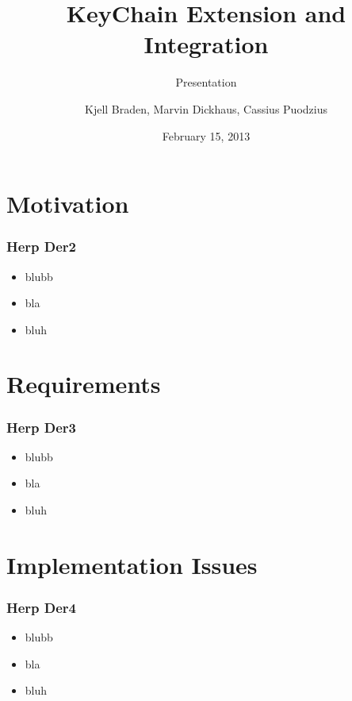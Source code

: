 \documentclass{beamer}
\title{KeyChain Extension and Integration}
\subtitle{Presentation}
\author[Braden, Dickhaus, Puodzius]{Kjell Braden, Marvin Dickhaus, Cassius Puodzius}
\institute{Fachbereich Informatik \\ TU Darmstadt}
\date{February 15, 2013}
\begin{document}
\begin{frame}
	\titlepage
\end{frame}
\begin{frame}
	\tableofcontents
\end{frame}

\section{Motivation}
	\begin{frame}
		\tableofcontents[currentsection]
	\end{frame}
	\begin{frame}
	\frametitle{Herp Der2}
	\begin{itemize}
		\item blubb
		\item bla
		\item bluh
	\end{itemize}
	\end{frame}

\section{Requirements}
	\begin{frame}
		\tableofcontents[currentsection]
	\end{frame}
	\begin{frame}
	\frametitle{Herp Der3}
		\begin{itemize}
			\item blubb
			\item bla
			\item bluh
		\end{itemize}
	\end{frame}

\section{Implementation Issues}
	\begin{frame}
		\tableofcontents[currentsection]
	\end{frame}
	\begin{frame}
	\frametitle{Herp Der4}
		\begin{itemize}
			\item blubb
			\item bla
			\item bluh
		\end{itemize}
	\end{frame}
\end{document}
